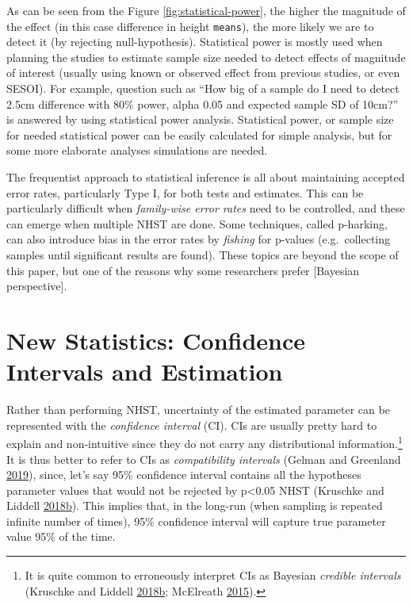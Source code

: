\documentclass[
]{book}
\begin{document}
As can be seen from the Figure \ref{fig:statistical-power}, the higher the magnitude of the effect (in this case difference in height \texttt{means}), the more likely we are to detect it (by rejecting null-hypothesis). Statistical power is mostly used when planning the studies to estimate sample size needed to detect effects of magnitude of interest (usually using known or observed effect from previous studies, or even SESOI). For example, question such as ``How big of a sample do I need to detect 2.5cm difference with 80\% power, alpha 0.05 and expected sample SD of 10cm?'' is answered by using statistical power analysis. Statistical power, or sample size for needed statistical power can be easily calculated for simple analysis, but for some more elaborate analyses simulations are needed.

The frequentist approach to statistical inference is all about maintaining accepted error rates, particularly Type I, for both tests and estimates. This can be particularly difficult when \emph{family-wise error rates} need to be controlled, and these can emerge when multiple NHST are done. Some techniques, called p-harking, can also introduce bias in the error rates by \emph{fishing} for p-values (e.g.~collecting samples until significant results are found). These topics are beyond the scope of this paper, but one of the reasons why some researchers prefer {[}Bayesian perspective{]}.

\hypertarget{new-statistics-confidence-intervals-and-estimation}{%
\section{New Statistics: Confidence Intervals and Estimation}\label{new-statistics-confidence-intervals-and-estimation}}

Rather than performing NHST, uncertainty of the estimated parameter can be represented with the \emph{confidence interval} (CI). CIs are usually pretty hard to explain and non-intuitive since they do not carry any distributional information.\footnote{It is quite common to erroneously interpret CIs as Bayesian \emph{credible intervals} (Kruschke and Liddell \protect\hyperlink{ref-kruschkeBayesianNewStatistics2018}{2018}\protect\hyperlink{ref-kruschkeBayesianNewStatistics2018}{b}; McElreath \protect\hyperlink{ref-mcelreathStatisticalRethinkingBayesian2015}{2015}).} It is thus better to refer to CIs as \emph{compatibility intervals} (Gelman and Greenland \protect\hyperlink{ref-gelmanAreConfidenceIntervals2019}{2019}), since, let's say 95\% confidence interval contains all the hypotheses parameter values that would not be rejected by p\textless0.05 NHST (Kruschke and Liddell \protect\hyperlink{ref-kruschkeBayesianNewStatistics2018}{2018}\protect\hyperlink{ref-kruschkeBayesianNewStatistics2018}{b}). This implies that, in the long-run (when sampling is repeated infinite number of times), 95\% confidence interval will capture true parameter value 95\% of the time.
\end{document}

